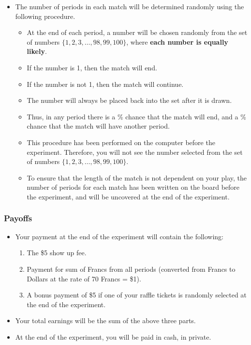 \documentclass[11pt]{article}
\newcommand{\dblbkt}[1]{\ignorespaces}
\begin{document}
\begin{itemize} 
\item The number of periods in each match will be determined randomly using the following procedure.  
\begin{itemize} 
  \item At the end of each period, \dblbkt{1}a number will be chosen randomly from the set of numbers \dblbkt{1} $ \{1,2,3,\ldots, 98, 99, 100\}$, where {\bf each number is equally likely}.  
  \item \dblbkt{1}If the number is 1, then the match will end.
  \item \dblbkt{1}If the number is not 1, then the match will continue.
  \item The number will always be placed back into the set after it is drawn.  
  \item \dblbkt{1}Thus, in any period there is a \dblbkt{1}1\% chance that the match will end, and a \dblbkt{1}99\% chance that the match will have another period.
  \item \dblbkt{1}This procedure has been performed on the computer before the experiment. Therefore, you will not see the number selected from the set of numbers $ \{1,2,3,\ldots, 98, 99, 100\}$.
  \item To ensure that the length of the match is not dependent on your play, the number of periods for each match has been written on the board before the experiment, and will be uncovered at the end of the experiment.  
\end{itemize} 
\end{itemize}



\subsubsection*{\dblbkt{3} Payoffs} 

\begin{itemize} 
\item \dblbkt{1} Your payment at the end of the experiment will contain the following:
\begin{enumerate} 
  \dblbkt{1} \item The \$5 show up fee.
  \dblbkt{1} \item Payment for sum of Francs from all periods \dblbkt{1}(converted from Francs to Dollars at the rate of 70 Francs = \$1). 
  \dblbkt{1} \item A bonus payment of \$5 if one of your raffle tickets is randomly selected at the end of the experiment.
\end{enumerate} 
\item Your total earnings will be the sum of the above three parts.
\item At the end of the experiment, you will be \dblbkt{1} paid in cash, in private.   
\end{itemize} 

\end{document}
